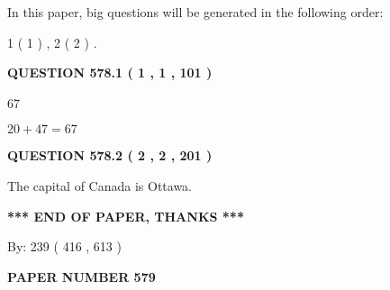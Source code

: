\documentclass[12pt]{article}
\begin{document}
   
   
\vspace{0.2in}
   
In this paper, big questions will be generated in the following order: 
   
   
   1 ( 1 )
 ,
   2 ( 2 )
 .
  
\vspace{0.2in}
  
{\textbf{\Large{QUESTION
578.1 
 ( 1 , 1 , 101 )
}}}
  
  
 
 
\noindent{}

67
 
 
 
 
\noindent{}

$ %
20 +  %
47=   %
67$
 
 
  
\vspace{0.2in}
  
{\textbf{\Large{QUESTION
578.2 
 ( 2 , 2 , 201 )
}}}
  
  
 
 
\noindent{}
 
 
The capital of Canada is Ottawa.
 
 
 
 
   
   
 \vspace{0.2in}
 
   
   
   
   
\vspace{1.0in} 
{\textbf{\large{ *** END OF PAPER, THANKS *** }}} 
   
   
\hspace{1.0in} By: 
 239 ( 416 ,  613 )
   
   
   
   
\newpage 
\setcounter{page}{ 
   579001 } 
   
   
   
   
 {\textbf{ \Large{ PAPER NUMBER  579  }}}
   
   
\vspace{0.2in}
   
   
   
\end{document}
